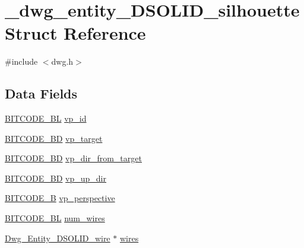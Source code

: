 \hypertarget{struct__dwg__entity__3DSOLID__silhouette}{\section{\-\_\-dwg\-\_\-entity\-\_\-D\-S\-O\-L\-I\-D\-\_\-silhouette \-Struct \-Reference}
\label{struct__dwg__entity__3DSOLID__silhouette}
}


{\ttfamily \#include $<$dwg.\-h$>$}

\subsection*{\-Data \-Fields}
\begin{DoxyCompactItemize}
\item 
\hyperlink{dwg_8h_aebd5f127038868cbabc3d55d91da776c}{\-B\-I\-T\-C\-O\-D\-E\-\_\-\-B\-L} \hyperlink{struct__dwg__entity__3DSOLID__silhouette_ae9f6a419a770daaec5cd8120b4ac4843}{vp\-\_\-id}
\item 
\hyperlink{dwg_8h_a00698ef1bb072aa0a9360c6fc1c57587}{\-B\-I\-T\-C\-O\-D\-E\-\_\-B\-D} \hyperlink{struct__dwg__entity__3DSOLID__silhouette_a1c0a00e5127e4f19da26e8aad0c5e349}{vp\-\_\-target}
\item 
\hyperlink{dwg_8h_a00698ef1bb072aa0a9360c6fc1c57587}{\-B\-I\-T\-C\-O\-D\-E\-\_\-B\-D} \hyperlink{struct__dwg__entity__3DSOLID__silhouette_a3566808d8b8590a361f1035fd66cdb6f}{vp\-\_\-dir\-\_\-from\-\_\-target}
\item 
\hyperlink{dwg_8h_a00698ef1bb072aa0a9360c6fc1c57587}{\-B\-I\-T\-C\-O\-D\-E\-\_\-B\-D} \hyperlink{struct__dwg__entity__3DSOLID__silhouette_aeda7c968c1f5e94484cec17cba09061e}{vp\-\_\-up\-\_\-dir}
\item 
\hyperlink{dwg_8h_ab533b1f62d9086749e3bb5b67e9f224e}{\-B\-I\-T\-C\-O\-D\-E\-\_\-\-B} \hyperlink{struct__dwg__entity__3DSOLID__silhouette_a3d310fa0cb450b26e2acc6c05395977a}{vp\-\_\-perspective}
\item 
\hyperlink{dwg_8h_aebd5f127038868cbabc3d55d91da776c}{\-B\-I\-T\-C\-O\-D\-E\-\_\-\-B\-L} \hyperlink{struct__dwg__entity__3DSOLID__silhouette_a89af0d91d9c1f3e5be6c7c4e01cec1e7}{num\-\_\-wires}
\item 
\hyperlink{dwg_8h_ac8df9f18d9df03f3ef3ee4707c0d4321}{\-Dwg\-\_\-\-Entity\-\_\-D\-S\-O\-L\-I\-D\-\_\-wire} $\ast$ \hyperlink{struct__dwg__entity__3DSOLID__silhouette_a3949cb1a6c32bce4702ccb9980c0198e}{wires}
\end{DoxyCompactItemize}


